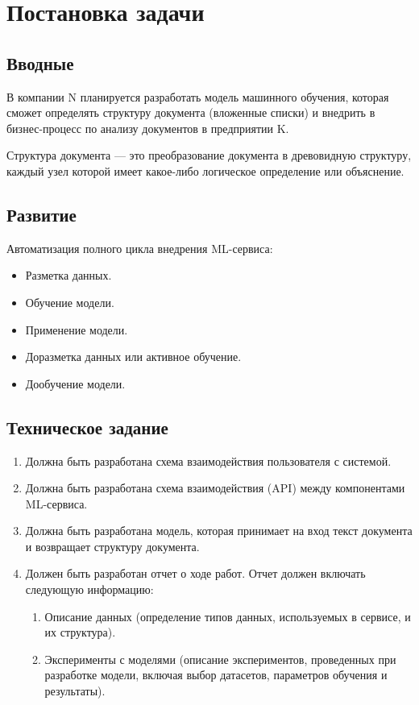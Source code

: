 \chapter{Постановка задачи}
\section{Вводные}
В компании N планируется разработать модель машинного обучения, которая сможет определять структуру документа (вложенные списки) и внедрить в бизнес-процесс по анализу документов в предприятии K.

Структура документа --- это преобразование документа в древовидную структуру, каждый узел которой имеет какое-либо логическое определение или объяснение.

\section{Развитие}

Автоматизация полного цикла внедрения ML-сервиса:
\begin{itemize}
\item Разметка данных.
\item Обучение модели.
\item Применение модели.
\item Доразметка данных или активное обучение.
\item Дообучение модели.
\end{itemize}

\section{Техническое задание}
\begin{enumerate}
\item Должна быть разработана схема взаимодействия пользователя с системой.
\item Должна быть разработана схема взаимодействия (API) между компонентами ML-сервиса.
\item Должна быть разработана модель, которая принимает на вход текст документа и возвращает структуру документа.
\item Должен быть разработан отчет о ходе работ. Отчет должен включать следующую информацию:
  \begin{enumerate}
  \item Описание данных (определение типов данных, используемых в сервисе, и их структура).
  \item Эксперименты с моделями (описание экспериментов, проведенных при разработке модели, включая выбор датасетов, параметров обучения и результаты).
  \end{enumerate}
\end{enumerate}
